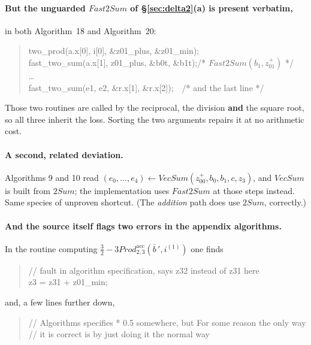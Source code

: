 \documentclass[11pt,a4paper]{article}
\newcommand{\alg}[1]{\mathit{#1}}
\newcommand{\Prodacc}[1]{\alg{3Prod}^{\mathrm{acc}}_{#1}}
\begin{document}
\paragraph{But the unguarded $\alg{Fast2Sum}$ of \S\ref{sec:delta2}(a) is
present verbatim,} in both Algorithm~18 and Algorithm~20:

\begin{quote}\ttfamily\small
two\_prod(a.x[0], i[0], \&z01\_plus, \&z01\_min);\\
fast\_two\_sum(a.x[1], z01\_plus, \&b0t, \&b1t);\quad /* $\alg{Fast2Sum}(b_1, z_{01}^{+})$ */\\
\dots\\
fast\_two\_sum(e1, e2, \&r.x[1], \&r.x[2]);\quad\ \ /* and the last line */
\end{quote}

\noindent
Those two routines are called by the reciprocal, the division \textbf{and} the
square root, so all three inherit the loss. Sorting the two arguments repairs
it at no arithmetic cost.

\paragraph{A second, related deviation.}
Algorithms 9 and 10 read
$(e_0,\dots,e_4) \leftarrow \alg{VecSum}(z_{00}^{+}, b_0, b_1, c, z_3)$, and
$\alg{VecSum}$ is built from $\alg{2Sum}$; the implementation uses
$\alg{Fast2Sum}$ at those steps instead. Same species of unproven shortcut.
(The \emph{addition} path does use $\alg{2Sum}$, correctly.)

\paragraph{And the source itself flags two errors in the appendix algorithms.}
In the routine computing $\frac32 - \Prodacc{2,3}(\bar b\,', i^{(1)})$ one
finds

\begin{quote}\ttfamily\small
// fault in algorithm specification, says z32 instead of z31 here\\
z3 = z31 + z01\_min;
\end{quote}

\noindent and, a few lines further down,

\begin{quote}\ttfamily\small
// Algorithms specifies * 0.5 somewhere, but For some reason the only way\\
// it is correct is by just doing it the normal way
\end{quote}
\end{document}
